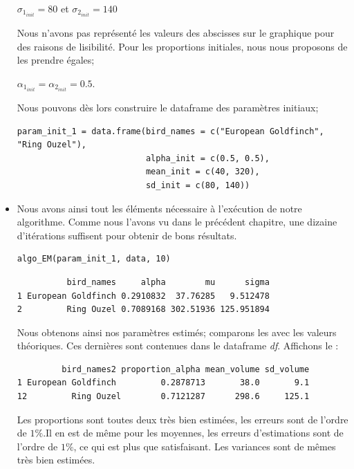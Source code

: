 \documentclass[frenchb]{report}
\newcommand{\1}{\mathbbm{1}}
\theoremstyle{definition}\newtheorem{defn}{Définition}
\theoremstyle{definition}\newtheorem{exm}{Exemple}
\theoremstyle{definition}\newtheorem{nota}{Notation}
\theoremstyle{definition}\newtheorem{rem}{Remarque}
\begin{document}
\begin{itemize}[label=\adfflowerleft]
\begin{center}
$\sigma_{1_{init}} =  80$ et $\sigma_{2_{init}} = 140$
\end{center}
Nous n'avons pas représenté les valeurs des abscisses sur le graphique pour des raisons de lisibilité.\newline
Pour les proportions initiales, nous nous proposons de les prendre égales;  
\begin{center}
$\alpha_{1_{init}}=\alpha_{2_{init}}=0.5$.
\end{center}
Nous pouvons dès lors construire le dataframe des paramètres initiaux;

\begin{lstlisting}
param_init_1 = data.frame(bird_names = c("European Goldfinch", "Ring Ouzel"),
                          alpha_init = c(0.5, 0.5),
                          mean_init = c(40, 320),
                          sd_init = c(80, 140))

\end{lstlisting}

\item Nous avons ainsi tout les éléments nécessaire à l'exécution de notre algorithme. Comme nous l'avons vu dans le précédent chapitre, une dizaine d'itérations suffisent pour obtenir de bons résultats.

\begin{lstlisting}
algo_EM(param_init_1, data, 10)
\end{lstlisting}

\begin{verbatim}
          bird_names     alpha        mu      sigma
1 European Goldfinch 0.2910832  37.76285   9.512478
2         Ring Ouzel 0.7089168 302.51936 125.951894
\end{verbatim}
Nous obtenons ainsi nos paramètres estimés; comparons les avec les valeurs théoriques. Ces dernières sont contenues dans le dataframe \textit{df}. Affichons le :
\begin{verbatim}
         bird_names2 proportion_alpha mean_volume sd_volume
1 European Goldfinch         0.2878713       38.0       9.1
12         Ring Ouzel        0.7121287      298.6     125.1
\end{verbatim}

Les proportions sont toutes deux très bien estimées, les erreurs sont de l'ordre de $1\%$.Il en est de même pour les moyennes, les erreurs d'estimations sont de l'ordre de $1\%$, ce qui est plus que satisfaisant. Les variances sont de mêmes très bien estimées.



\end{itemize}
\end{document}
